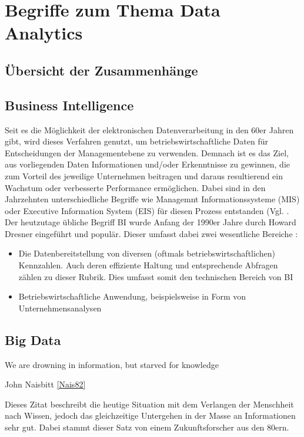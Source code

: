 
\section{Begriffe zum Thema Data Analytics}
\subsection{Übersicht der Zusammenhänge}
\subsection{Business Intelligence}
\label{sub:bi}
Seit es die Möglichkeit der elektronischen Datenverarbeitung in den 60er Jahren gibt, wird dieses Verfahren genutzt, um betriebswirtschaftliche Daten für Entscheidungen der Managementebene zu verwenden.
Demnach ist es das Ziel, aus vorliegenden Daten Informationen und/oder Erkenntnisse zu gewinnen, die zum Vorteil des jeweilige Unternehmen beitragen und daraus resultierend ein Wachstum oder verbesserte Performance ermöglichen.
Dabei sind in den Jahrzehnten unterschiedliche Begriffe wie \glqq Managemnt Informationssysteme (MIS)\grqq{} oder \glqq Executive Information System (EIS)\grqq{} für diesen Prozess entstanden (Vgl. \cite[S.3]{Engels.2015}.
Der heutzutage übliche Begriff \acrfull{BI} wurde Anfang der 1990er Jahre durch Howard Dresner eingeführt und populär.
Dieser umfasst dabei zwei wesentliche Bereiche \cite{Kemper.2004}:
\begin{itemize}
\item Die Datenbereitstellung von diversen (oftmals betriebswirtschaftlichen) Kennzahlen. 
Auch deren effiziente Haltung und entsprechende Abfragen zählen zu dieser Rubrik.
Dies umfasst somit den technischen Bereich von \gls{BI}
\item Betriebswirtschaftliche Anwendung, beispielsweise in Form von Unternehmensanalysen 
\end{itemize}

\subsection{Big Data}
\label{sub:bigdata}
\epigraph{\glqq We are drowning in information, but starved for knowledge\grqq}{ John Naisbitt \ref{Nais82}}
Dieses Zitat beschreibt die heutige Situation mit dem Verlangen der Menschheit nach Wissen, jedoch das gleichzeitige Untergehen in der Masse an Informationen sehr gut. 
Dabei stammt dieser Satz von einem Zukunftsforscher aus den 80ern.

